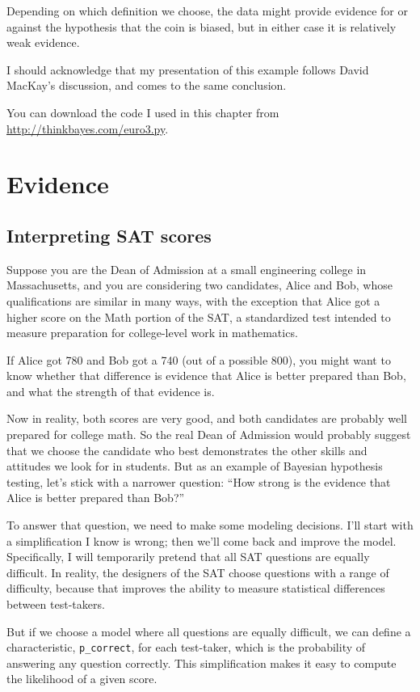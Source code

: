 \documentclass[12pt]{book}
\begin{document}
Depending on which definition we choose, the data might provide
evidence for or against the hypothesis that the coin is biased, but
in either case it is relatively weak evidence.

I should acknowledge that my presentation of this example follows
David MacKay's discussion, and comes to the same conclusion.

You can download the code I used in this chapter from
\url{http://thinkbayes.com/euro3.py}.


\chapter{Evidence}

\section{Interpreting SAT scores}

Suppose you are the Dean of Admission at a small engineering
college in Massachusetts, and you are considering two candidates,
Alice and Bob, whose qualifications are similar in many ways,
with the exception that Alice got a higher score on the Math
portion of the SAT, a standardized test intended to measure
preparation for college-level work in mathematics.

If Alice got 780 and Bob got a 740 (out of a possible 800), you might
want to know whether that difference is evidence that Alice is better
prepared than Bob, and what the strength of that evidence is.

Now in reality, both scores are very good, and both 
candidates are probably well prepared for college math.  So
the real Dean of Admission would probably suggest that we choose
the candidate who best demonstrates the other skills and
attitudes we look for in students.  But as an example of
Bayesian hypothesis testing, let's stick with a narrower question:
``How strong is the evidence that Alice is better prepared
than Bob?''

To answer that question, we need to make some modeling decisions.
I'll start with a simplification I know is wrong; then we'll come back
and improve the model.  Specifically, I will temporarily pretend that
all SAT questions are equally difficult.  In reality, the designers of
the SAT choose questions with a range of difficulty, because that
improves the ability to measure statistical differences between
test-takers.

But if we choose a model where all questions are equally difficult, we
can define a characteristic, \verb"p_correct", for each test-taker,
which is the probability of answering any question correctly.  This
simplification makes it easy to compute the likelihood of a given
score.
\end{document}
